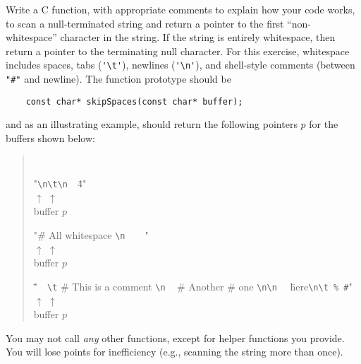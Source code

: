 \documentclass[10pt]{article}
\begin{document}
Write a C function, 
with appropriate comments to explain how your code works,
to scan a null-terminated string and return a pointer to the first
``non-whitespace'' character in the string.
If the string is entirely whitespace,
then return a pointer to the terminating null character.
For this exercise, whitespace includes spaces, tabs (\verb|'\t'|),
newlines (\verb|'\n'|), and shell-style comments (between \verb|"#"| and newline).
The function prototype should be
\begin{verbatim}
    const char* skipSpaces(const char* buffer);
\end{verbatim}
and as an illustrating example,
should return the following pointers $p$ for the buffers shown below:
\begin{quote} \tt
\begin{tabbing}
  "\=\verb|\n\t\n|~~\=4"\\
  \> $\uparrow$ \> $\uparrow$ \\
  \> buffer \> $p$ 
\end{tabbing}
\begin{tabbing}
  "\=\# All whitespace \verb|\n|~~~~"\=\\
  \> $\uparrow$ \> $\uparrow$ \\
  \> buffer \> $p$ 
\end{tabbing}
\begin{tabbing}
  "\=~~\verb|\t| \# This is a comment \verb|\n| ~ \# Another \# one \verb|\n\n| ~~\=here\verb|\n\t % #|"\\
  \> $\uparrow$ \> $\uparrow$ \\
  \> buffer \> $p$ 
\end{tabbing}
\end{quote}
You may not call \emph{any} other functions,
except for helper functions you provide.
You will lose points for inefficiency 
(e.g., scanning the string more than once).
\end{document}
